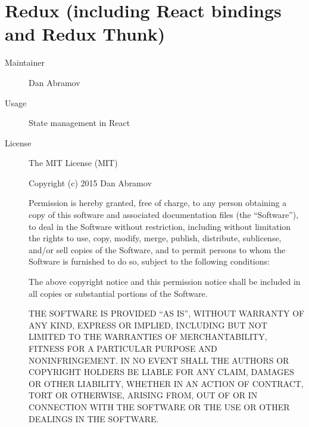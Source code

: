   \section*{Redux (including React bindings and Redux Thunk)}
    \begin{description}
      \item[Maintainer] Dan Abramov
      \item[Usage] State management in React
      \item[License] \scriptsize The MIT License (MIT)

        Copyright (c) 2015 Dan Abramov

        Permission is hereby granted, free of charge, to any person obtaining a copy of this software and associated documentation files (the ``Software''), to deal in the Software without restriction, including without limitation the rights to use, copy, modify, merge, publish, distribute, sublicense, and/or sell copies of the Software, and to permit persons to whom the Software is furnished to do so, subject to the following conditions:

        The above copyright notice and this permission notice shall be included in all copies or substantial portions of the Software.

        THE SOFTWARE IS PROVIDED ``AS IS'', WITHOUT WARRANTY OF ANY KIND, EXPRESS OR IMPLIED, INCLUDING BUT NOT LIMITED TO THE WARRANTIES OF MERCHANTABILITY, FITNESS FOR A PARTICULAR PURPOSE AND NONINFRINGEMENT. IN NO EVENT SHALL THE AUTHORS OR COPYRIGHT HOLDERS BE LIABLE FOR ANY CLAIM, DAMAGES OR OTHER LIABILITY, WHETHER IN AN ACTION OF CONTRACT, TORT OR OTHERWISE, ARISING FROM, OUT OF OR IN CONNECTION WITH THE SOFTWARE OR THE USE OR OTHER DEALINGS IN THE SOFTWARE.
    \end{description}

